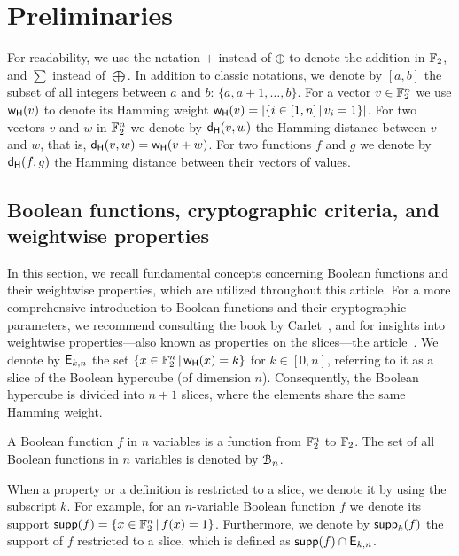 \documentclass[11pt]{llncs}
\begin{document}
\section{Preliminaries}\label{sec:prelim}


For readability, we use the notation $+$ instead of 
$\oplus$ to denote the addition in $\mathbb{F}_2$, and $\sum$ instead of $\bigoplus$. 
In addition to classic notations, we denote by $ [a,b] $ the subset of all integers between $a$ and $b$: $\{a, a+1, \ldots,b\}$. 
For a vector $v\in \mathbb{F}_2^n$ we use $\mathsf{w_H}(v)$ to denote its Hamming weight $\mathsf{w_H}(v)=|\{ i \in [1,n] \, | \, v_i=1 \}|$. 
For two vectors $v$ and $w$ in $\mathbb{F}_2^n$ we denote by $\mathsf{d_H}(v,w)$ the Hamming distance between $v$ and $w$, that is, $\mathsf{d_H}(v,w)=\mathsf{w_H}(v+w)$. 
For two functions $f$ and $g$ we denote by $\mathsf{d_H}(f,g)$ the Hamming distance between their vectors of values.

\subsection{Boolean functions, cryptographic criteria, and weightwise properties}
In this section, we recall fundamental concepts concerning Boolean functions and their weightwise properties, which are utilized throughout this article. For a more comprehensive introduction to Boolean functions and their cryptographic parameters, we recommend consulting the book by Carlet~\cite{Carlet20}, and for insights into weightwise properties—also known as properties on the slices—the article~\cite{TOSC:CarMeaRot17}.
We denote by $\mathsf{E}_{k,n}$ the set $\{x\in \mathbb{F}_2^n \, | \, \mathsf{w_H}(x)=k \}$ for $k \in [0,n]$, referring to it as a slice of the Boolean hypercube (of dimension $n$). 
Consequently, the Boolean hypercube is divided into $n+1$ slices, where the elements share the same Hamming weight.


\begin{definition}\label{def:bool_f}
	A Boolean function $f$ in $n$ variables is a function from $\mathbb{F}_2^n$ to $\mathbb{F}_2$. 
	The set of all Boolean functions in $n$ variables is denoted by $\mathcal{B}_n$.
\end{definition}


When a property or a definition is restricted to a slice, we denote it by using the subscript $k$. 
For example, for an $n$-variable Boolean function $f$ we denote its support $\mathsf{supp}(f)=\{x\in \mathbb{F}_2^n \, | \, f(x)=1  \}$.
Furthermore, we denote by $\mathsf{supp}_{k}(f)$ the support of $f$ restricted to a slice, which is defined as $\mathsf{supp}(f)\cap \mathsf{E}_{k,n}$.
\end{document}
